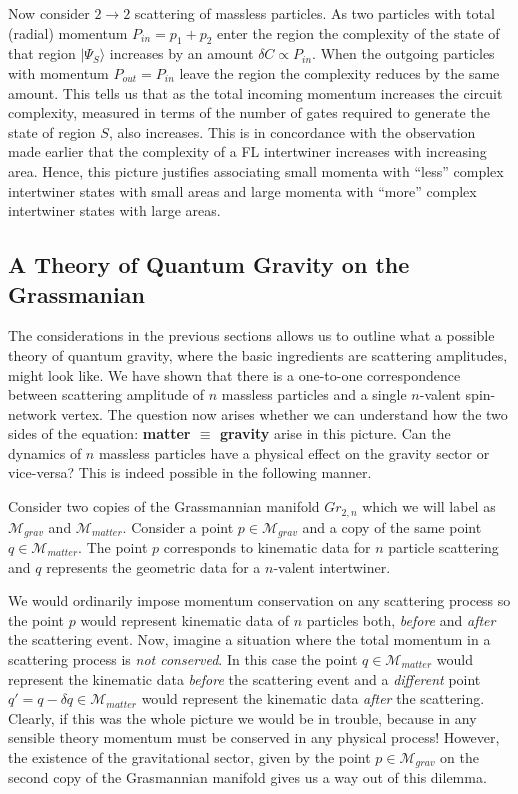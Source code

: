 \documentclass[twocolumn,final,aps,nofootinbib,nobibnotes]{revtex4-2}
\newcommand{\mc}[1]{\mathcal{#1}}
\newcommand{\ket}[1]{\vert #1 \rangle}
\begin{document}
Now consider $ 2 \rightarrow 2 $ scattering of massless particles. As two particles with total (radial) momentum $ P_{in} = p_1 + p_2 $ enter the region the complexity of the state of that region $ \ket{\Psi_S} $ increases by an amount $ \delta C \propto P_{in} $. When the outgoing particles with momentum $ P_{out} = P_{in} $ leave the region the complexity reduces by the same amount. This tells us that as the total incoming momentum increases the circuit complexity, measured in terms of the number of gates required to generate the state of region $ S $, also increases. This is in concordance with the observation made earlier that the complexity of a FL intertwiner increases with increasing area. Hence, this picture justifies associating small momenta with ``less'' complex intertwiner states with small areas and large momenta with ``more'' complex intertwiner states with large areas.

\subsection{A Theory of Quantum Gravity on the Grassmanian}\label{sec:qgtheory}

The considerations in the previous sections allows us to outline what a possible theory of quantum gravity, where the basic ingredients are scattering amplitudes, might look like. We have shown that there is a one-to-one correspondence between scattering amplitude of $ n $ massless particles and a single $ n $-valent spin-network vertex. The question now arises whether we can understand how the two sides of the equation: \textbf{matter $ \equiv $ gravity} arise in this picture. Can the dynamics of $ n $ massless particles have a physical effect on the gravity sector or vice-versa? This is indeed possible in the following manner.

Consider two copies of the Grassmannian manifold $ Gr_{2,n} $ which we will label as $ \mc M_{grav} $ and $ \mc M_{matter} $. Consider a point $ p \in \mc M_{grav} $ and a copy of the same point $ q \in \mc M_{matter} $. The point $ p $ corresponds to kinematic data for $ n $ particle scattering and $ q $ represents the geometric data for a $ n $-valent intertwiner.

We would ordinarily impose momentum conservation on any scattering process so the point $ p $ would represent kinematic data of $ n $ particles both, \textit{before} and \textit{after} the scattering event. Now, imagine a situation where the total momentum in a scattering process is \textit{not conserved}. In this case the point $ q \in \mc M_{matter} $ would represent the kinematic data \textit{before} the scattering event and a \textit{different} point $ q' = q - \delta q \in \mc M_{matter} $ would represent the kinematic data \textit{after} the scattering. Clearly, if this was the whole picture we would be in trouble, because in any sensible theory momentum must be conserved in any physical process! However, the existence of the gravitational sector, given by the point $ p \in \mc M_{grav} $ on the second copy of the Grasmannian manifold gives us a way out of this dilemma.
\end{document}
